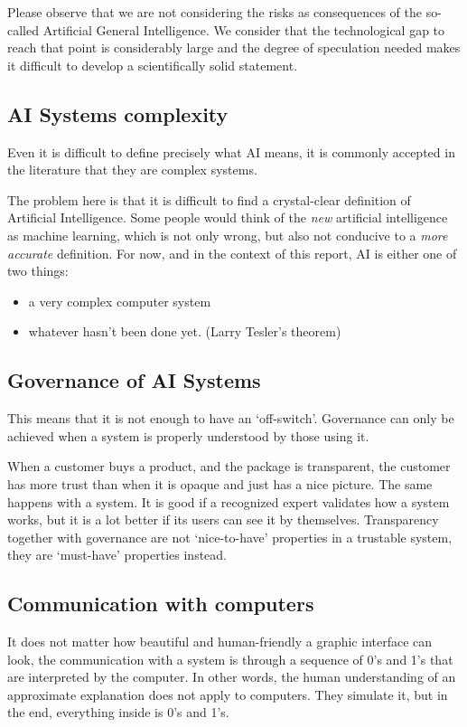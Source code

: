 Please observe that we are not considering the risks as consequences of the so-called Artificial General Intelligence.
We consider that the technological gap to reach that point is considerably large and the degree of speculation needed makes it difficult to develop a scientifically solid statement.

\subsection{AI Systems complexity}

Even it is difficult to define precisely what AI means, it is commonly accepted in the literature that they are complex systems.

The problem here is that it is difficult to find a crystal-clear definition of Artificial Intelligence.
Some people would think of the \textit{new} artificial intelligence as machine learning, which is not only wrong, but also not conducive to a \textit{more accurate} definition.
For now, and in the context of this report, AI is either one of two things:
\begin{itemize}
    \item a very complex computer system
    \item whatever hasn't been done yet. (Larry Tesler's theorem)
\end{itemize}

\subsection{Governance of AI Systems}

This means that it is not enough to have an `off-switch'.
Governance can only be achieved when a system is properly understood by those using it.

When a customer buys a product, and the package is transparent, the customer has more trust than when it is opaque and just has a nice picture.
The same happens with a system.
It is good if a recognized expert validates how a system works, but it is a lot better if its users can see it by themselves.
Transparency together with governance are not `nice-to-have' properties in a trustable system, they are `must-have' properties instead.

\subsection{Communication with computers}

It does not matter how beautiful and human-friendly a graphic interface can look,
the communication with a system is through a sequence of 0's and 1's that are interpreted by the computer.
In other words, the human understanding of an approximate explanation does not apply to computers.
They simulate it, but in the end, everything inside is 0's and 1's.

